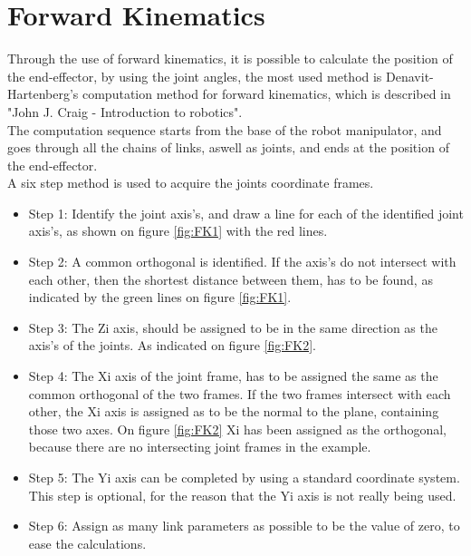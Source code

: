\section{Forward Kinematics}
Through the use of forward kinematics, it is possible to calculate the position of the end-effector, by using the joint angles, the most used method is Denavit-Hartenberg's computation method for forward kinematics, which is described in "John J. Craig - Introduction to robotics"\cite{JohnC}.\\
The computation sequence starts from the base of the robot manipulator, and goes through all the chains of links, aswell as joints, and ends at the position of the end-effector.\\
A six step method is used to acquire the joints coordinate frames.\\
\begin{itemize}
    \item Step 1: Identify the joint axis's, and draw a line for each of the identified joint axis's, as shown on figure \ref{fig:FK1} with the red lines.
    \item Step 2: A common orthogonal is identified. If the axis's do not intersect with each other, then the shortest distance between them, has to be found, as indicated by the green lines on figure \ref{fig:FK1}.
    \item Step 3: The Zi axis, should be assigned to be in the same direction as the axis's of the joints. As indicated on figure \ref{fig:FK2}.
    \item Step 4: The Xi axis of the joint frame, has to be assigned the same as the common orthogonal of the two frames. If the two frames intersect with each other, the Xi axis is assigned as to be the normal to the plane, containing those two axes. On figure \ref{fig:FK2} Xi has been assigned as the orthogonal, because there are no intersecting joint frames in the example.
    \item Step 5: The Yi axis can be completed by using a standard coordinate system. This step is optional, for the reason that the Yi axis is not really being used. 
    \item Step 6: Assign as many link parameters as possible to be the value of zero, to ease the calculations.
\end{itemize}

